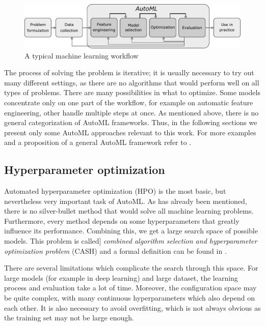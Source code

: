 \begin{figure}[h]\centering
\includegraphics[width=\textwidth]{../img/workflow-pdfa.pdf}
\caption{A typical machine learning workflow}
\label{pic01:workflow}
\end{figure}

The process of solving the problem is iterative; it is usually necessary to try
out many different settings, as there are no algorithms that would perform
well on all types of problems.
There are many possibilities in what to optimize. Some models concentrate only
on one part of the workflow, for example on automatic feature engineering,
other handle multiple steps at once. As mentioned above, there is no general
categorization %
of AutoML frameworks. Thus, in the following sections we present only some
AutoML approaches relevant to this work. For more examples and a proposition
of a general AutoML framework refer to \cite{DBLP:journals/corr/abs-1810-13306}.

\subsection{Hyperparameter optimization}
Automated hyperparameter optimization (HPO) is the most basic, but nevertheless
very important task of AutoML. As has already been mentioned, there is no
silver-bullet method that would solve all machine learning problems.
Furthermore, every method depends on some hyperparameters that greatly
influence its performance. Combining this, we get a large search space of
possible models. This problem is called]
\emph{combined algorithm selection and hyperparameter optimization problem}
(CASH) and a formal definition can be found in
\citep{DBLP:journals/corr/abs-1208-3719}.

There are several limitations which complicate the search through this space.
For large models (for example in deep learning) and large dataset, the
learning process and evaluation take a lot of time. Moreover, the
configuration space may be quite complex, with many continuous hyperparameters
which also depend on each other. It is also necessary to avoid overfitting,
which is not always obvious as the training set may not be large enough.

